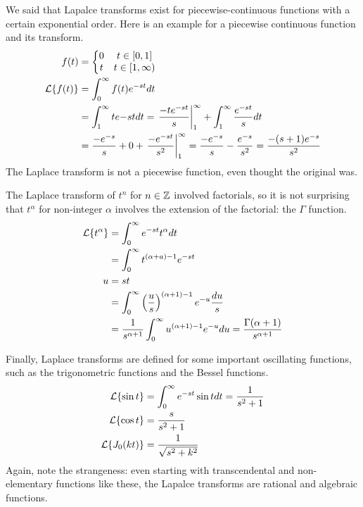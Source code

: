\documentclass[fleqn,letterpaper]{report}
\begin{document}
\begin{example}
We said that Lapalce transforms exist for piecewise-continuous
functions with a certain exponential order. Here is an
example for a piecewise continuous function and its transform.
\begin{align*}
f(t) & = \left\{ \begin{matrix} 0 & t \in [0,1] \\ t & t \in [1,
\infty) \end{matrix} \right. \\
\mathcal{L} \{ f(t) \} & = \int_0^\infty f(t) e^{-st} dt \\
& = \int_1^\infty te{-st} dt = \left. \frac{-te^{-st}}{s}
\right|_1^\infty + \int_1^\infty \frac{e^{-st}}{s} dt \\
& = \frac{-e^{-s}}{s} + 0 + \left. \frac{-e^{-st}}{s^2}
\right|_1^\infty = \frac{-e^{-s}}{s} - \frac{e^{-s}}{s^2} =
\frac{-(s+1)e^{-s}}{s^2} 
\end{align*} 
The Laplace transform is not a piecewise function, even
thought the original was. 
\end{example}

\begin{example}
The Laplace transform of $t^n$ for $n \in \mathbb{Z}$ involved
factorials, so it is not surprising that $t^\alpha$ for
non-integer $\alpha$ involves the extension of the factorial:
the $\Gamma$ function.
\begin{align*}
\mathcal{L} \{ t^\alpha \} & = \int_0^\infty e^{-st} t^{\alpha} dt \\
& = \int_0^\infty t^{(\alpha + a) - 1} e^{-st} \\
u & = st \\
& = \int_0^\infty \left( \frac{u}{s} \right)^{(\alpha+1)-1}
e^{-u} \frac{du}{s} \\
& = \frac{1}{s^{\alpha +1}} \int_0^\infty u^{(\alpha+ 1)-1}
e^{-u} du = \frac{\Gamma(\alpha +1)}{s^{\alpha +1}}
\end{align*} 
\end{example}

\begin{example}
Finally, Laplace transforms are defined for some important
oscillating functions, such as the trigonometric functions and
the Bessel functions. 
\begin{align*}
\mathcal{L} \{ \sin t \} & = \int_0^\infty e^{-st} \sin t dt = \frac{1}{s^2+1} \\
\mathcal{L} \{ \cos t \} & = \frac{s}{s^2+1} \\
\mathcal{L} \{ J_0(kt) \} & = \frac{1}{\sqrt{s^2 + k^2}}
\end{align*} 
Again, note the strangeness: even starting with transcendental
and non-elementary functions like these, the Lapalce
transforms are rational and algebraic functions.
\end{example}
\end{document}
